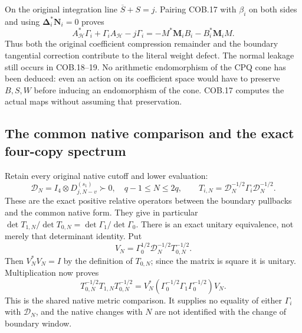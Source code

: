 On the original integration line $\overline S+S=j$.  Pairing COB.17
with $\beta_i$ on both sides and using
$\boldsymbol\Delta_i^*\mathbf N_i=0$ proves
\[
 \boxed{A_{\mathcal H}^*\Gamma_i+\Gamma_iA_{\mathcal H}-j\Gamma_i
       =-M^*\mathbf M_iB_i-B_i^*\mathbf M_iM.}
 \tag{COB.20}
\]
Thus both the original coefficient compression remainder and the
boundary tangential correction contribute to the literal weight defect.
The normal leakage still occurs in COB.18--19.  No arithmetic
endomorphism of the CPQ cone has been deduced: even an action on its
coefficient space would have to preserve $B,S,W$ before inducing an
endomorphism of the cone.  COB.17 computes the actual maps without
assuming that preservation.

\subsection{The common native comparison and the exact four-copy spectrum}

Retain every original native cutoff and lower evaluation:
\[
 \mathcal D_N=I_4\otimes D_{j,N-v}^{(s_1)}\succ0,
 \quad q-1\le N\le2q,\qquad
 T_{i,N}=\mathcal D_N^{-1/2}\Gamma_i\mathcal D_N^{-1/2}.
 \tag{COB.21}
\]
These are the exact positive relative operators between the boundary
pullbacks and the common native form.  They give in particular
$\det T_{1,N}/\det T_{0,N}=\det\Gamma_1/\det\Gamma_0$.
There is an exact unitary equivalence, not merely that determinant
identity.  Put
\[
 V_N=\Gamma_0^{1/2}\mathcal D_N^{-1/2}T_{0,N}^{-1/2}.
\]
Then $V_N^*V_N=I$ by the definition of $T_{0,N}$; since the matrix
is square it is unitary.  Multiplication now proves
\[
 T_{0,N}^{-1/2}T_{1,N}T_{0,N}^{-1/2}
   =V_N^*(\Gamma_0^{-1/2}\Gamma_1\Gamma_0^{-1/2})V_N.
 \tag{COB.22}
\]
This is the shared native metric comparison.  It supplies no equality
of either $\Gamma_i$ with $\mathcal D_N$, and the native changes
with $N$ are not identified with the change of boundary window.

